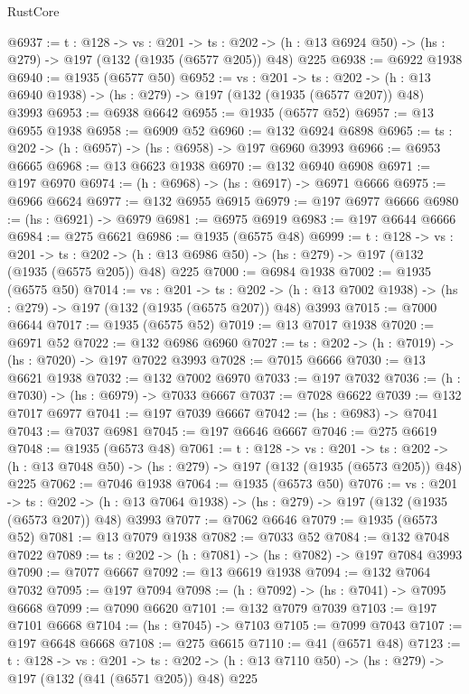 \begin{lexlean}{RustCore}
\begin{coremodule}
@6937 := {t : @128} ->
  {vs : @201} ->
  {ts : @202} -> (h : @13 @6924 @50) -> (hs : @279) -> @197 (@132 (@1935 (@6577 @205)) @48) @225
@6938 := @6922 @1938
@6940 := @1935 (@6577 @50)
@6952 := {vs : @201} ->
  {ts : @202} -> (h : @13 @6940 @1938) -> (hs : @279) -> @197 (@132 (@1935 (@6577 @207)) @48) @3993
@6953 := @6938 @6642
@6955 := @1935 (@6577 @52)
@6957 := @13 @6955 @1938
@6958 := @6909 @52
@6960 := @132 @6924 @6898
@6965 := {ts : @202} -> (h : @6957) -> (hs : @6958) -> @197 @6960 @3993
@6966 := @6953 @6665
@6968 := @13 @6623 @1938
@6970 := @132 @6940 @6908
@6971 := @197 @6970
@6974 := (h : @6968) -> (hs : @6917) -> @6971 @6666
@6975 := @6966 @6624
@6977 := @132 @6955 @6915
@6979 := @197 @6977 @6666
@6980 := (hs : @6921) -> @6979
@6981 := @6975 @6919
@6983 := @197 @6644 @6666
@6984 := @275 @6621
@6986 := @1935 (@6575 @48)
@6999 := {t : @128} ->
  {vs : @201} ->
  {ts : @202} -> (h : @13 @6986 @50) -> (hs : @279) -> @197 (@132 (@1935 (@6575 @205)) @48) @225
@7000 := @6984 @1938
@7002 := @1935 (@6575 @50)
@7014 := {vs : @201} ->
  {ts : @202} -> (h : @13 @7002 @1938) -> (hs : @279) -> @197 (@132 (@1935 (@6575 @207)) @48) @3993
@7015 := @7000 @6644
@7017 := @1935 (@6575 @52)
@7019 := @13 @7017 @1938
@7020 := @6971 @52
@7022 := @132 @6986 @6960
@7027 := {ts : @202} -> (h : @7019) -> (hs : @7020) -> @197 @7022 @3993
@7028 := @7015 @6666
@7030 := @13 @6621 @1938
@7032 := @132 @7002 @6970
@7033 := @197 @7032
@7036 := (h : @7030) -> (hs : @6979) -> @7033 @6667
@7037 := @7028 @6622
@7039 := @132 @7017 @6977
@7041 := @197 @7039 @6667
@7042 := (hs : @6983) -> @7041
@7043 := @7037 @6981
@7045 := @197 @6646 @6667
@7046 := @275 @6619
@7048 := @1935 (@6573 @48)
@7061 := {t : @128} ->
  {vs : @201} ->
  {ts : @202} -> (h : @13 @7048 @50) -> (hs : @279) -> @197 (@132 (@1935 (@6573 @205)) @48) @225
@7062 := @7046 @1938
@7064 := @1935 (@6573 @50)
@7076 := {vs : @201} ->
  {ts : @202} -> (h : @13 @7064 @1938) -> (hs : @279) -> @197 (@132 (@1935 (@6573 @207)) @48) @3993
@7077 := @7062 @6646
@7079 := @1935 (@6573 @52)
@7081 := @13 @7079 @1938
@7082 := @7033 @52
@7084 := @132 @7048 @7022
@7089 := {ts : @202} -> (h : @7081) -> (hs : @7082) -> @197 @7084 @3993
@7090 := @7077 @6667
@7092 := @13 @6619 @1938
@7094 := @132 @7064 @7032
@7095 := @197 @7094
@7098 := (h : @7092) -> (hs : @7041) -> @7095 @6668
@7099 := @7090 @6620
@7101 := @132 @7079 @7039
@7103 := @197 @7101 @6668
@7104 := (hs : @7045) -> @7103
@7105 := @7099 @7043
@7107 := @197 @6648 @6668
@7108 := @275 @6615
@7110 := @41 (@6571 @48)
@7123 := {t : @128} ->
  {vs : @201} ->
  {ts : @202} -> (h : @13 @7110 @50) -> (hs : @279) -> @197 (@132 (@41 (@6571 @205)) @48) @225

\end{coremodule}
\end{lexlean}
